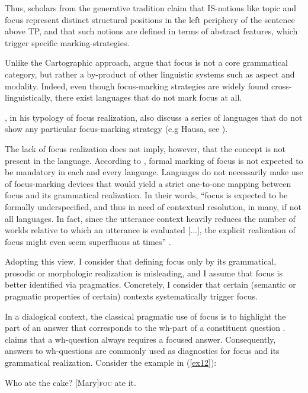 Thus, scholars from the generative tradition claim that IS-notions like topic and focus represent distinct structural positions in the left periphery of the sentence above TP, and that such notions are defined in terms of abstract features, which trigger specific marking-strategies.

Unlike the Cartographic approach, \textcite{matic2013meanings} argue that focus is not a core grammatical category, but rather a by-product of other linguistic systems such as aspect and modality. Indeed, even though focus-marking strategies are widely found cross-linguistically, there exist languages that do not mark focus at all.

\textcite{buring2009towards}, in his typology of focus realization, also discuss a series of languages that do not show any particular focus-marking strategy (e.g Hausa, see \cite{green2003ex, hartmann2008focus}). 

The lack of focus realization does not imply, however, that the concept is not present in the language.
According to \textcite{zimmermann2011focus}, formal marking of focus is not expected to be mandatory in each and every language. Languages do not necessarily make use of focus-marking devices that would yield a strict one-to-one mapping between focus and its grammatical realization. In their words, ``focus is expected to be formally underspecified, and thus in need of contextual resolution, in many, if not all languages. In fact, since the utterance context heavily reduces the number of worlds relative to which an utterance is evaluated [...], the explicit realization of focus might even seem superfluous at times” \parencite[1658]{zimmermann2011focus}.

Adopting this view, I consider that defining focus only by its grammatical, prosodic or morphologic realization is misleading, and I assume that focus is better identified via pragmatics. Concretely, I consider that certain (semantic or pragmatic properties of certain) contexts systematically trigger focus.

In a dialogical context, the classical pragmatic use of focus is to highlight the part of an answer that corresponds to the wh-part of a constituent question \parencite{paul2010prinzipien}. \textcite{drubig2003toward} claims that a wh-question always requires a focused answer. Consequently, answers to wh-questions are commonly used as diagnostics for focus and its grammatical realization. Consider the example in (\ref{ex12}):

\ea \label{ex12}
\ea Who ate the cake? 
\ex{} [Mary]\textsc{foc} \normalsize ate it.
\z \z


